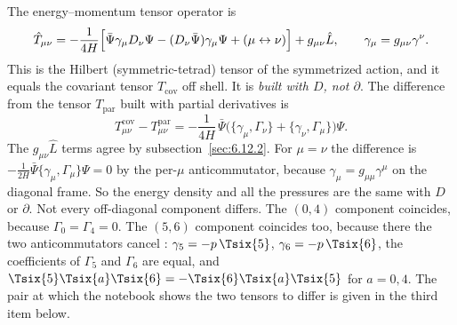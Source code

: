 The energy--momentum tensor operator is
\begin{equation}
  \hat T_{\mu\nu}=-\frac{1}{4H}\Bigl[\bar\Psi\gamma_\mu D_\nu\Psi-(D_\nu\bar\Psi)\gamma_\mu\Psi+(\mu\leftrightarrow\nu)\Bigr]+g_{\mu\nu}\hat L,
  \qquad \gamma_\mu=g_{\mu\nu}\gamma^\nu .
\end{equation}
This is the Hilbert (symmetric-tetrad) tensor of the symmetrized action, and it equals the
covariant tensor $T_{\text{cov}}$ off shell. It is \emph{built with $D$, not $\partial$}. The
difference from the tensor $T_{\text{par}}$ built with partial derivatives is \cfderived
\begin{equation}
  T^{\text{cov}}_{\mu\nu}-T^{\text{par}}_{\mu\nu}=-\frac{1}{4H}\,\bar\Psi\bigl(\{\gamma_\mu,\Gamma_\nu\}+\{\gamma_\nu,\Gamma_\mu\}\bigr)\Psi .
\end{equation}
The $g_{\mu\nu}\hat L$ terms agree by subsection~\ref{sec:6.12.2}. For $\mu=\nu$ the difference is
$-\frac{1}{2H}\bar\Psi\{\gamma_\mu,\Gamma_\mu\}\Psi=0$ by the per-$\mu$ anticommutator, because
$\gamma_\mu=g_{\mu\mu}\gamma^\mu$ on the diagonal frame. So the energy density and all the pressures
are the same with $D$ or $\partial$. Not every off-diagonal component differs. The $(0,4)$
component coincides, because $\Gamma_0=\Gamma_4=0$. The $(5,6)$ component coincides too, because
there the two anticommutators cancel \cfderived: $\gamma_5=-p\,\Tsix{5}$, $\gamma_6=-p\,\Tsix{6}$,
the coefficients of $\Gamma_5$ and $\Gamma_6$ are equal, and
$\Tsix{5}\Tsix{a}\Tsix{6}=-\Tsix{6}\Tsix{a}\Tsix{5}$ for $a=0,4$. The pair at which the
notebook shows the two tensors to differ is given in the third item below.
